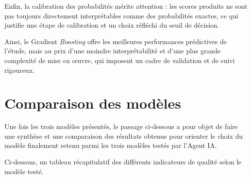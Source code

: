 Enfin, la calibration des probabilités mérite attention : les scores produits ne sont pas toujours directement interprétables comme des probabilités exactes, ce qui justifie une étape de calibration et un choix réfléchi du seuil de décision.

Ainsi, le Gradient \textit{Boosting} offre les meilleures performances prédictives de l'étude, mais au prix d'une moindre interprétabilité et d'une plus grande complexité de mise en œuvre, qui imposent un cadre de validation et de suivi rigoureux.

\section{Comparaison des modèles}

Une fois les trois modèles présentés, le passage ci-dessous a pour objet de faire une synthèse et une comparaison des résultats obtenus pour orienter le choix du modèle finalement retenu parmi les trois modèles testés par l'Agent IA.

Ci-dessous, un tableau récapitulatif des différents indicateurs de qualité selon le modèle testé.

